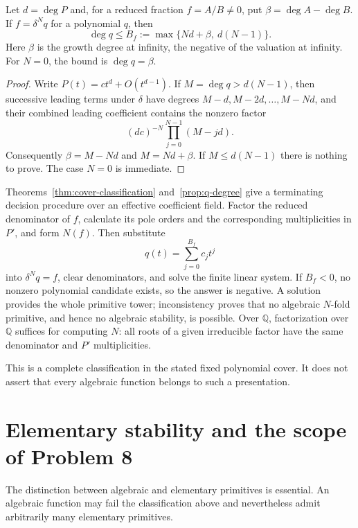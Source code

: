 \begin{proposition}\label{prop:q-degree}
Let $d=\deg P$ and, for a reduced fraction $f=A/B\ne0$, put
$\beta=\deg A-\deg B$. If $f=\delta^Nq$ for a polynomial $q$, then
\begin{equation}\label{eq:q-degree}
 \deg q\le B_f:=\max\{Nd+\beta,\ d(N-1)\}.
\end{equation}
Here $\beta$ is the growth degree at infinity, the negative of the
valuation at infinity. For $N=0$, the bound is $\deg q=\beta$.
\end{proposition}
\begin{proof}
Write $P(t)=c t^d+O(t^{d-1})$. If $M=\deg q>d(N-1)$, then successive
leading terms under $\delta$ have degrees $M-d,M-2d,\ldots,M-Nd$,
and their combined leading coefficient contains the nonzero factor
\[
 (dc)^{-N}\prod_{j=0}^{N-1}(M-jd).
\]
Consequently $\beta=M-Nd$ and $M=Nd+\beta$. If
$M\le d(N-1)$ there is nothing to prove. The case $N=0$ is immediate.
\end{proof}

Theorems~\ref{thm:cover-classification} and~\ref{prop:q-degree} give a
terminating decision procedure over an effective coefficient field.
Factor the reduced denominator of $f$, calculate its pole orders and
the corresponding multiplicities in $P'$, and form $N(f)$.
Then substitute
\[
 q(t)=\sum_{j=0}^{B_f}c_jt^j
\]
into $\delta^Nq=f$, clear denominators, and solve the finite linear
system. If $B_f<0$, no nonzero polynomial candidate exists, so the
answer is negative. A solution provides the whole primitive tower;
inconsistency proves that no algebraic $N$-fold primitive, and hence
no algebraic stability, is possible. Over $\mathbb Q$, factorization
over $\mathbb Q$ suffices for computing $N$: all roots of a given
irreducible factor have the same denominator and $P'$ multiplicities.

This is a complete classification in the stated fixed polynomial
cover. It does not assert that every algebraic function belongs to
such a presentation.

\section{Elementary stability and the scope of Problem 8}
\label{sec:elementary}
The distinction between algebraic and elementary primitives is essential.
An algebraic function may fail the classification above and nevertheless
admit arbitrarily many elementary primitives.

